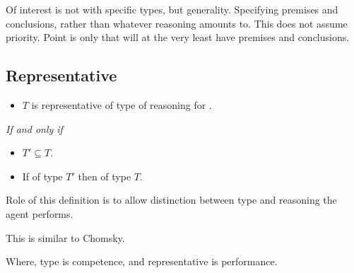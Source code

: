 \begin{note}
  Of interest is not with specific types, but generality.
  Specifying premises and conclusions, rather than whatever reasoning amounts to.
  This does not assume priority.
  Point is only that will at the very least have premises and conclusions.
\end{note}

\subsection{Representative}
\label{sec:represntative}

\begin{note}
  \begin{definition}
    \label{def:type-r}

    \begin{itemize}
    \item
      \(T\) is representative of type of reasoning for \vAgent{}.
    \end{itemize}

    \emph{If and only if}

    \begin{itemize}
    \item
      \(T' \subseteq T\).
    \item
      If of type \(T'\) then of type \(T\).
    \end{itemize}
  \end{definition}
  Role of this definition is to allow distinction between type and reasoning the agent performs.
\end{note}

\begin{note}
  This is similar to Chomsky.

  Where, type is competence, and representative is performance.
\end{note}

